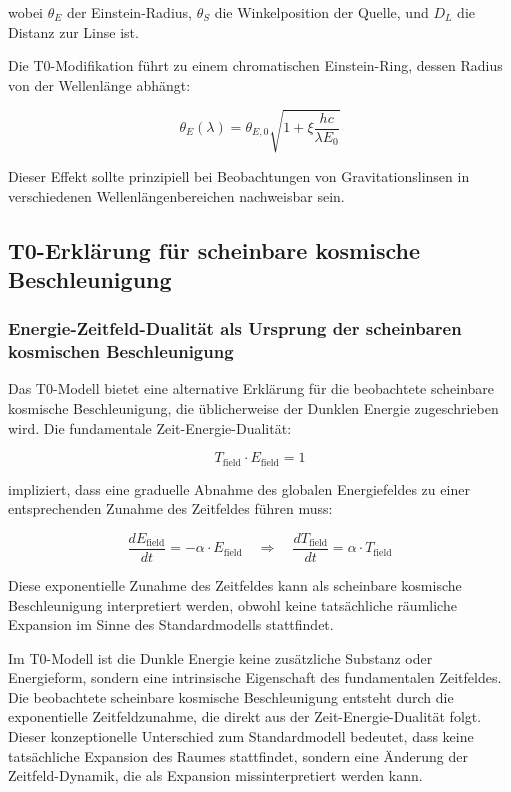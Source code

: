 \documentclass[12pt,a4paper]{article}
\theoremstyle{definition}
\begin{document}
wobei $\theta_E$ der Einstein-Radius, $\theta_S$ die Winkelposition der Quelle, und $D_L$ die Distanz zur Linse ist.

Die T0-Modifikation führt zu einem chromatischen Einstein-Ring, dessen Radius von der Wellenlänge abhängt:

\begin{equation}
	\theta_E(\lambda) = \theta_{E,0} \sqrt{1 + \xi \frac{hc}{\lambda E_0}}
\end{equation}

Dieser Effekt sollte prinzipiell bei Beobachtungen von Gravitationslinsen in verschiedenen Wellenlängenbereichen nachweisbar sein.

\subsection{T0-Erklärung für scheinbare kosmische Beschleunigung}

\subsubsection{Energie-Zeitfeld-Dualität als Ursprung der scheinbaren kosmischen Beschleunigung}

Das T0-Modell bietet eine alternative Erklärung für die beobachtete scheinbare kosmische Beschleunigung, die üblicherweise der Dunklen Energie zugeschrieben wird. Die fundamentale Zeit-Energie-Dualität:

\begin{equation}
	T_{\text{field}} \cdot E_{\text{field}} = 1
\end{equation}

impliziert, dass eine graduelle Abnahme des globalen Energiefeldes zu einer entsprechenden Zunahme des Zeitfeldes führen muss:

\begin{equation}
	\frac{dE_{\text{field}}}{dt} = -\alpha \cdot E_{\text{field}} \quad \Rightarrow \quad \frac{dT_{\text{field}}}{dt} = \alpha \cdot T_{\text{field}}
\end{equation}

Diese exponentielle Zunahme des Zeitfeldes kann als scheinbare kosmische Beschleunigung interpretiert werden, obwohl keine tatsächliche räumliche Expansion im Sinne des Standardmodells stattfindet.

\begin{wichtig}
	Im T0-Modell ist die Dunkle Energie keine zusätzliche Substanz oder Energieform, sondern eine intrinsische Eigenschaft des fundamentalen Zeitfeldes. Die beobachtete scheinbare kosmische Beschleunigung entsteht durch die exponentielle Zeitfeldzunahme, die direkt aus der Zeit-Energie-Dualität folgt. Dieser konzeptionelle Unterschied zum Standardmodell bedeutet, dass keine tatsächliche Expansion des Raumes stattfindet, sondern eine Änderung der Zeitfeld-Dynamik, die als Expansion missinterpretiert werden kann.
\end{wichtig}
\end{document}

